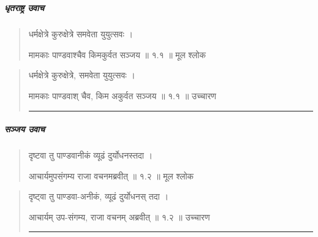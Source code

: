 \chapter{}

\sanskrit
\paragraph{\sanskrit धृतराष्ट्र उवाच}

\begin{quotation}

	धर्मक्षेत्रे कुरुक्षेत्रे समवेता युयुत्सवः  । 
	
	मामकाः पाण्डवाश्चैव किमकुर्वत सञ्जय  ॥ १.१ ॥  मूल श्लोक

\end{quotation}

\begin{quotation}

धर्मक्षेत्रे कुरुक्षेत्रे, समवेता युयुत्सवः  । 

मामकाः पाण्डवाश् चैव, किम अकुर्वत सञ्जय   ॥ १.१ ॥   उच्चारण

\noindent\rule{16cm}{0.4pt} 
\end{quotation}
%
%
%
\paragraph{\sanskrit सञ्जय उवाच}

\begin{quotation}
दृष्टवा तु पाण्डवानीकं व्यूढं दुर्योधनस्तदा  । 

आचार्यमुपसंगम्य राजा वचनमब्रवीत्‌  ॥ १.२ ॥  मूल श्लोक
\end{quotation}

\begin{quotation}

दृष्ट्वा तु पाण्डवा-अनीकं, व्यूढं दुर्योधनस् तदा  । 

आचार्यम्‌ उप-संगम्य, राजा वचनम् अब्रवीत्  ॥ १.२ ॥  उच्चारण

\noindent\rule{16cm}{0.4pt} 
\end{quotation}


